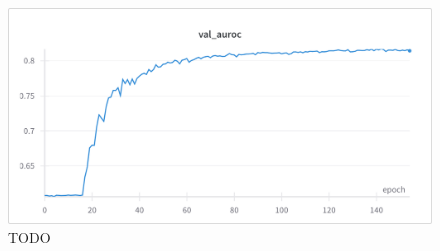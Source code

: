 \begin{figure}
    \centering
    \includegraphics[width=\textwidth]{./figures/noisy_training}
    \caption{TODO}
    \label{fig:noisy_training}
\end{figure}
